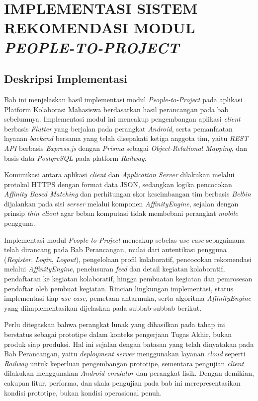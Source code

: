 \cleardoublepage
\chapter{IMPLEMENTASI SISTEM REKOMENDASI MODUL \emph{PEOPLE-TO-PROJECT}}
\label{chap:implementasi}

\section{Deskripsi Implementasi}

Bab ini menjelaskan hasil implementasi modul \emph{People-to-Project} pada aplikasi Platform Kolaborasi Mahasiswa berdasarkan hasil perancangan pada bab sebelumnya. Implementasi modul ini mencakup pengembangan aplikasi \emph{client} berbasis \emph{Flutter} yang berjalan pada perangkat \emph{Android}, serta pemanfaatan layanan \emph{backend} bersama yang telah disepakati ketiga anggota tim, yaitu \emph{REST API} berbasis \emph{Express.js} dengan \emph{Prisma} sebagai \emph{Object-Relational Mapping}, dan basis data \emph{PostgreSQL} pada platform \emph{Railway}.

Komunikasi antara aplikasi \emph{client} dan \emph{Application Server} dilakukan melalui protokol HTTPS dengan format data JSON, sedangkan logika pencocokan \emph{Affinity Based Matching} dan perhitungan skor keseimbangan tim berbasis \emph{Belbin} dijalankan pada sisi \emph{server} melalui komponen \emph{AffinityEngine}, sejalan dengan prinsip \emph{thin client} \autocite{sommerville2016} agar beban komputasi tidak membebani perangkat \emph{mobile} pengguna.

Implementasi modul \emph{People-to-Project} mencakup sebelas \emph{use case} sebagaimana telah dirancang pada Bab Perancangan, mulai dari autentikasi pengguna (\emph{Register}, \emph{Login}, \emph{Logout}), pengelolaan profil kolaboratif, pencocokan rekomendasi melalui \emph{AffinityEngine}, penelusuran \emph{feed} dan detail kegiatan kolaboratif, pendaftaran ke kegiatan kolaboratif, hingga pembuatan kegiatan dan pemrosesan pendaftar oleh pembuat kegiatan. Rincian lingkungan implementasi, status implementasi tiap \emph{use case}, pemetaan antarmuka, serta algoritma \emph{AffinityEngine} yang diimplementasikan dijelaskan pada subbab-subbab berikut.

Perlu ditegaskan bahwa perangkat lunak yang dihasilkan pada tahap ini berstatus sebagai prototipe dalam konteks pengerjaan Tugas Akhir, bukan produk siap produksi. Hal ini sejalan dengan batasan yang telah dinyatakan pada Bab Perancangan, yaitu \emph{deployment server} menggunakan layanan \emph{cloud} seperti \emph{Railway} untuk keperluan pengembangan prototipe, sementara pengujian \emph{client} dilakukan menggunakan \emph{Android emulator} dan perangkat fisik. Dengan demikian, cakupan fitur, performa, dan skala pengujian pada bab ini merepresentasikan kondisi prototipe, bukan kondisi operasional penuh.

